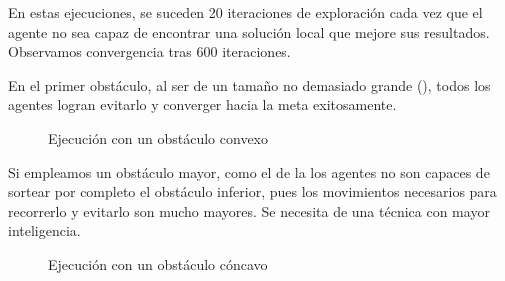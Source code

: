 	En estas ejecuciones, se suceden 20 iteraciones de exploración cada vez que el agente no sea capaz de encontrar una solución local que mejore sus resultados. Observamos convergencia tras 600 iteraciones.
	
	En el primer obstáculo, al ser de un tamaño no demasiado grande (), todos los agentes logran evitarlo y converger hacia la meta exitosamente.
	
	\begin{figure}[htbp]
	    \centering
	    \caption{Ejecución con un obstáculo convexo}
	    \label{fig:6}
	\end{figure}
	
	Si empleamos un obstáculo mayor, como el de la  los agentes no son capaces de sortear por completo el obstáculo inferior, pues los movimientos necesarios para recorrerlo y evitarlo son mucho mayores. Se necesita de una técnica con mayor inteligencia.
	
	\begin{figure}[htbp]
	    \centering
	    \caption{Ejecución con un obstáculo cóncavo}
	    \label{fig:8}
	\end{figure}
